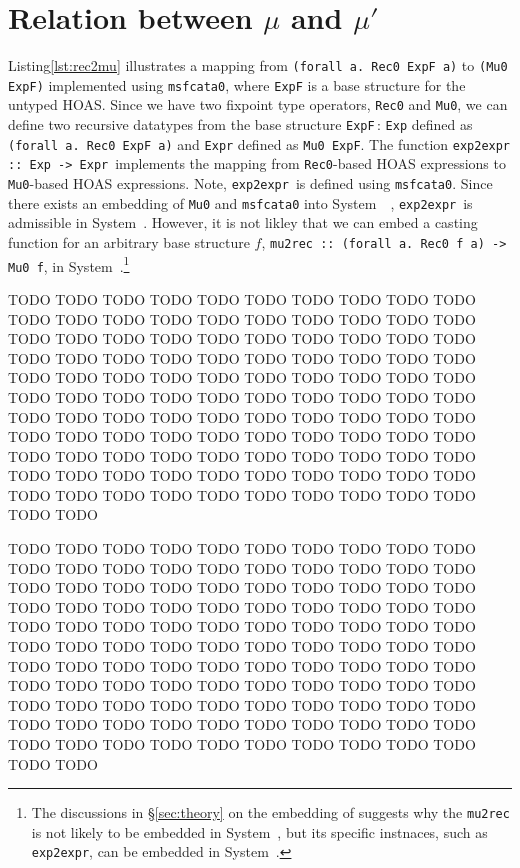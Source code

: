 \section{Relation between $\mu$ and $\mu'$}\label{sec:murec}
Listing\;\ref{lst:rec2mu} illustrates a mapping from
\lstinline{(forall a. Rec0 ExpF a)}  to \lstinline{(Mu0 ExpF)} implemented
using \lstinline{msfcata0}, where \lstinline{ExpF} is a base structure
for the untyped HOAS. Since we have two fixpoint type operators,
\lstinline{Rec0} and \lstinline{Mu0}, we can define two recursive datatypes
from the base structure \lstinline{ExpF}\,:
\lstinline{Exp} defined as \lstinline{(forall a. Rec0 ExpF a)} and
\lstinline{Expr} defined as \lstinline{Mu0 ExpF}.
The function \lstinline{exp2expr :: Exp -> Expr}\, implements the mapping from
\lstinline{Rec0}-based HOAS expressions to \lstinline{Mu0}-based
HOAS expressions. Note, \lstinline{exp2expr}\, is defined
using \lstinline{msfcata0}.  Since there exists an embedding of
\lstinline{Mu0} and \lstinline{msfcata0} into System~\Fw\ \cite{AhnShe11},
\lstinline{exp2expr}\, is admissible in System~\Fw. However, it is not likley
that we can embed a casting function for an arbitrary base structure $f$,
\lstinline{mu2rec :: (forall a. Rec0 f a) -> Mu0 f}, in System~\Fw.\footnote{
	The discussions in \S\ref{sec:theory} on the embedding of \msfit{}
	suggests why the \lstinline{mu2rec} is not likely to be embedded
	in System~\Fw, but its specific instnaces, such as
	\lstinline{exp2expr}, can be embedded in System~\Fw.}

TODO TODO TODO TODO TODO TODO TODO TODO TODO TODO TODO TODO TODO TODO
TODO TODO TODO TODO TODO TODO TODO TODO TODO TODO TODO TODO TODO TODO
TODO TODO TODO TODO TODO TODO TODO TODO TODO TODO TODO TODO TODO TODO
TODO TODO TODO TODO TODO TODO TODO TODO TODO TODO TODO TODO TODO TODO
TODO TODO TODO TODO TODO TODO TODO TODO TODO TODO TODO TODO TODO TODO
TODO TODO TODO TODO TODO TODO TODO TODO TODO TODO TODO TODO TODO TODO
TODO TODO TODO TODO TODO TODO TODO TODO TODO TODO TODO TODO TODO TODO
TODO TODO TODO TODO TODO TODO TODO TODO TODO TODO TODO TODO TODO TODO


\begin{figure}

\vspace*{-3ex}
\end{figure}

TODO TODO TODO TODO TODO TODO TODO TODO TODO TODO TODO TODO TODO TODO
TODO TODO TODO TODO TODO TODO TODO TODO TODO TODO TODO TODO TODO TODO
TODO TODO TODO TODO TODO TODO TODO TODO TODO TODO TODO TODO TODO TODO
TODO TODO TODO TODO TODO TODO TODO TODO TODO TODO TODO TODO TODO TODO
TODO TODO TODO TODO TODO TODO TODO TODO TODO TODO TODO TODO TODO TODO
TODO TODO TODO TODO TODO TODO TODO TODO TODO TODO TODO TODO TODO TODO
TODO TODO TODO TODO TODO TODO TODO TODO TODO TODO TODO TODO TODO TODO
TODO TODO TODO TODO TODO TODO TODO TODO TODO TODO TODO TODO TODO TODO


